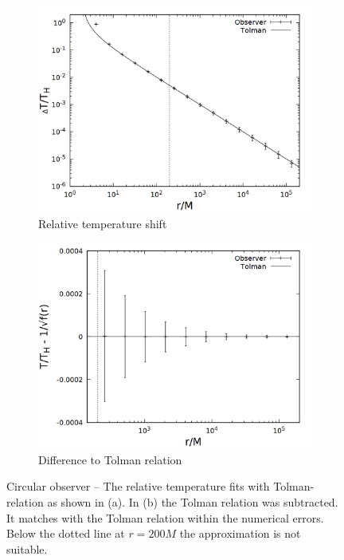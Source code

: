 \begin{figure}[h]
  \centering
  \begin{subfigure}[h]{0.5\textwidth}
    \centering
    \includegraphics[width=\textwidth]{cpp/final/circ.png}
    \caption{Relative temperature shift}
  \end{subfigure}%
  \begin{subfigure}[h]{0.5\textwidth}
    \centering
    \includegraphics[width=\textwidth]{cpp/final/circ_tolman.png}
    \caption{Difference to Tolman relation}
  \end{subfigure}
  \caption[Circular observer]{Circular observer -- The relative temperature fits with Tolman-relation as shown in (a). In (b) the Tolman relation was subtracted. It matches with the Tolman relation within the numerical errors. Below the dotted line at \(r = 200M\) the approximation is not suitable.}
  \label{fig:bh_circ}
\end{figure} 

